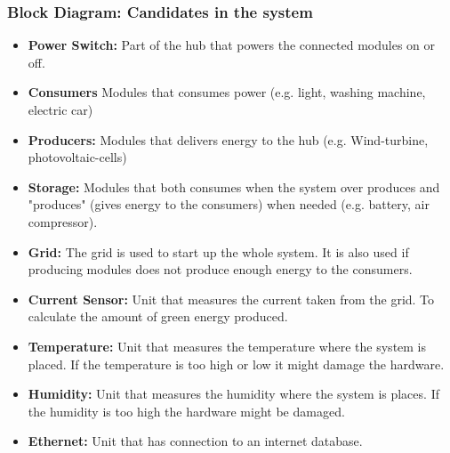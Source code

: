 \subsubsection{Block Diagram: Candidates in the system}
\begin{itemize}
	\item \textbf{Power Switch:} Part of the hub that powers the connected modules on or off.
	\item \textbf{Consumers} Modules that consumes power (e.g. light, washing machine, electric car)
	\item \textbf{Producers:} Modules that delivers energy to the hub (e.g. Wind-turbine, photovoltaic-cells)
	\item \textbf{Storage:} Modules that both consumes when the system over produces and "produces" (gives energy to the consumers) when needed (e.g. battery, air compressor). 
	\item \textbf{Grid:} The grid is used to start up the whole system. It is also used if producing modules does not produce enough energy to the consumers.
	\item \textbf{Current Sensor:} Unit that measures the current taken from the grid. To calculate the amount of green energy produced.
	\item \textbf{Temperature:} Unit that measures the temperature where the system is placed. If the temperature is too high or low it might damage the hardware.
	\item \textbf{Humidity:} Unit that measures the humidity where the system is places. If the humidity is too high the hardware might be damaged.
	\item \textbf{Ethernet:} Unit that has connection to an internet database.
\end{itemize}


